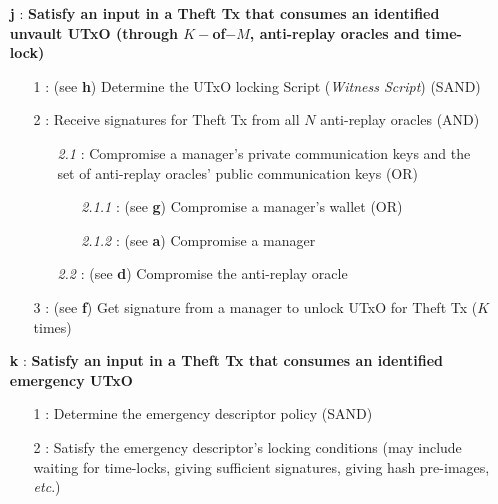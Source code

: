 \documentclass[runningheads]{llncs}
\begin{document}
{\footnotesize
\begin{itemize}[noitemsep,parsep=0pt,partopsep=0pt, leftmargin=0.7cm]
\item[\textbf{j} :] \textbf{Satisfy an input in a Theft Tx that consumes an identified unvault UTxO (through $K-$of$-M$, anti-replay oracles and time-lock)}
\begin{itemize}[noitemsep,topsep=0pt,parsep=0pt,partopsep=0pt, leftmargin=0.8cm]
\item[1 :] (see \textbf{h}) Determine the UTxO locking Script (\textit{Witness Script}) (SAND)
\item[2 :] Receive signatures for Theft Tx from all $N$ anti-replay oracles (AND)
\begin{itemize}[noitemsep,topsep=0pt,parsep=0pt,partopsep=0pt, leftmargin=0.9cm]
\item[\textit{2.1} :] Compromise a manager’s private communication keys and the set of anti-replay oracles’ public communication keys (OR)
\begin{itemize}[noitemsep,topsep=0pt,parsep=0pt,partopsep=0pt, leftmargin=1cm]
\item[\textit{2.1.1} :] (see \textbf{g}) Compromise a manager’s wallet (OR)
\item[\textit{2.1.2} :] (see \textbf{a}) Compromise a manager
\end{itemize}
\item[\textit{2.2} :] (see \textbf{d}) Compromise the anti-replay oracle
\end{itemize}
\item[3 :] (see \textbf{f}) Get signature from a manager to unlock UTxO for Theft Tx ($K$ times)
\end{itemize}
\end{itemize}
}

{\footnotesize
\begin{itemize}[noitemsep,parsep=0pt,partopsep=0pt, leftmargin=0.7cm]
\item[\textbf{k} :] \textbf{Satisfy an input in a Theft Tx that consumes an identified emergency UTxO}
\begin{itemize}[noitemsep,topsep=0pt,parsep=0pt,partopsep=0pt, leftmargin=0.8cm]
\item[1 :] Determine the emergency descriptor policy (SAND)
\item[2 :] Satisfy the emergency descriptor's locking conditions (may include waiting for time-locks, giving sufficient signatures, giving hash pre-images, \textit{etc}.)
\end{itemize}
\end{itemize}
}
\end{document}
